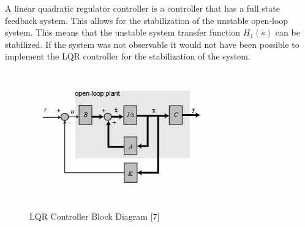 \documentclass[12pt]{article} %
\begin{document}
A linear quadratic regulator controller is a controller that has a full state feedback system. This allows for the stabilization of the unstable open-loop system. This means that the unstable system transfer function $H_1(s)$ can be stabilized. If the system was not observable it would not have been possible to implement the LQR controller for the stabilization of the system.
\\\\
\begin{figure}[h]
\caption{LQR Controller Block Diagram [7]}
\includegraphics[height=5cm, width=8cm]{./images/lqr_block.jpg}
\label{fig:lqrblock}
\centering
\end{figure}
\end{document}
